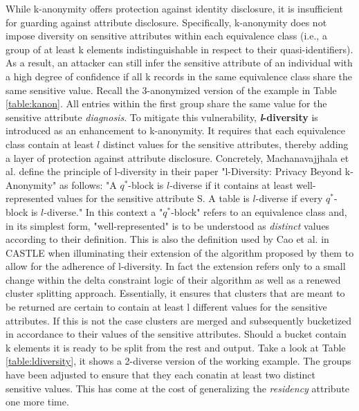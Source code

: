 While k-anonymity offers protection against identity disclosure, it is insufficient for guarding against attribute disclosure. Specifically, k-anonymity does not impose diversity on sensitive attributes within each equivalence class (i.e., a group of at least k elements indistinguishable in respect to their quasi-identifiers). As a result, an attacker can still infer the sensitive attribute of an individual with a high degree of confidence if all k records in the same equivalence class share the same sensitive value. Recall the 3-anonymized version of the example in Table \ref{table:kanon}. All entries within the first group share the same value for the sensitive attribute \textit{diagnosis}. To mitigate this vulnerability, \mbox{\textbf{\textit{l}-diversity}} is introduced as an enhancement to k-anonymity. It requires that each equivalence class contain at least $l$ distinct values for the sensitive attributes, thereby adding a layer of protection against attribute disclosure. Concretely, Machanavajjhala et al. define the principle of l-diversity in their paper "l-Diversity: Privacy Beyond k-Anonymity" \cite{machanavajjhala2007ldiversity} as follows: "A $q^*$-block is $l$-diverse if it contains at least  well-represented values for the sensitive attribute S. A table is $l$-diverse if every $q^*$-block is $l$-diverse." In this context a "$q^*$-block" refers to an equivalence class and, in its simplest form, "well-represented" is to be understood as \textit{distinct} values according to their definition. This is also the definition used by Cao et al. in CASTLE when illuminating their extension of the algorithm proposed by them to allow for the adherence of l-diversity. In fact the extension refers only to a small change within the delta constraint logic of their algorithm as well as a renewed cluster splitting approach. Essentially, it ensures that clusters that are meant to be returned are certain to contain at least l different values for the sensitive attributes. If this is not the case clusters are merged and subsequently bucketized in accordance to their values of the sensitive attributes. Should a bucket contain k elements it is ready to be split from the rest and output. Take a look at Table \ref{table:ldiversity}, it shows a 2-diverse version of the working example. The groups have been adjusted to ensure that they each conatin at least two distinct sensitive values. This has come at the cost of generalizing the \textit{residency} attribute one more time. 

